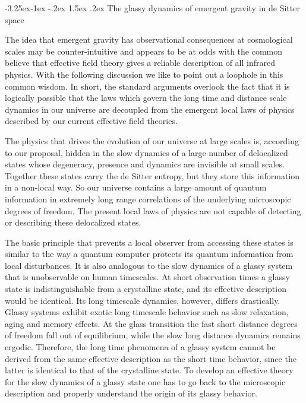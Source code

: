 \documentclass[a4paper,12pt]{article}
\makeatletter
\renewcommand\subsection{\@startsection{subsection}{2}{\z@}%
                                     {-3.25ex\@plus -1ex \@minus -.2ex}%
                                     {1.5ex \@plus .2ex}%
                                     {\normalfont\bfseries}}
\makeatother
\begin{document}
\subsection{The glassy dynamics of emergent gravity in de Sitter space}
 
The idea that emergent gravity has observational consequences at cosmological scales may be counter-intuitive and appears to be at odds with the common believe that effective field theory gives a reliable description of all infrared physics.  With the following discussion we like to point out a loophole in this common wisdom. In short, the standard arguments overlook the fact that it is logically possible that the laws which govern the long time and distance scale dynamics in our universe are decoupled from the emergent local laws of physics described by our current effective field theories. 

 The physics that drives the evolution of our universe at large scales is, according to our proposal, hidden in the slow dynamics of a large number of delocalized states whose degeneracy, presence and dynamics are invisible at small scales. Together these states carry the de Sitter entropy, but they store this information in a non-local way. So our universe contains a large amount of quantum information in extremely long range correlations of the underlying microscopic degrees of freedom.   The present local laws of physics are not capable of detecting or describing these delocalized states. 

The basic principle that prevents a local observer from accessing these states is similar to the way a quantum computer protects its quantum information from local disturbances. It is also analogous to the slow dynamics of a glassy system that is unobservable on human timescales. At short observation times a glassy state is indistinguishable from a crystalline state, 
and its effective description would be identical. Its long timescale dynamics, however, differs 
drastically. Glassy systems exhibit exotic long timescale behavior such as slow 
relaxation, aging and memory effects. At the glass 
transition the fast short distance degrees of freedom fall out of equilibrium, 
while the slow long distance dynamics remains ergodic. Therefore, the long time phenomena of a glassy system cannot be derived from the same effective description as the short time behavior, since the latter is identical to that of the crystalline state.  To develop an effective theory for the slow dynamics of a glassy state one has to go back to the  microscopic description 
and properly understand the origin of its glassy behavior. 
\end{document}
